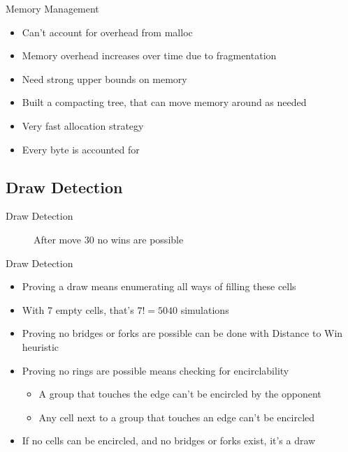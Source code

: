 \documentclass{beamer} %
\begin{document}
\begin{frame}{Memory Management}
\begin{itemize}
\item Can't account for overhead from malloc
\item Memory overhead increases over time due to fragmentation
\item Need strong upper bounds on memory
\item Built a compacting tree, that can move memory around as needed
\item Very fast allocation strategy
\item Every byte is accounted for
\end{itemize}
\end{frame}

\subsection{Draw Detection}


\begin{frame}{Draw Detection}
\begin{figure}
	\centering
	\begin{HavannahBoard}[board size=4,coordinate style=classical,show coordinates=false]
	\end{HavannahBoard}
	\caption{After move 30 no wins are possible}
\end{figure}
\end{frame}

\begin{frame}{Draw Detection}
\begin{itemize}
\item Proving a draw means enumerating all ways of filling these cells
\item With 7 empty cells, that's $7! = 5040$ simulations
\item Proving no bridges or forks are possible can be done with Distance to Win heuristic
\item Proving no rings are possible means checking for encirclability
	\begin{itemize}
	\item A group that touches the edge can't be encircled by the opponent
	\item Any cell next to a group that touches an edge can't be encircled
	\end{itemize}
\item If no cells can be encircled, and no bridges or forks exist, it's a draw
\end{itemize}
\end{frame}
\end{document}
